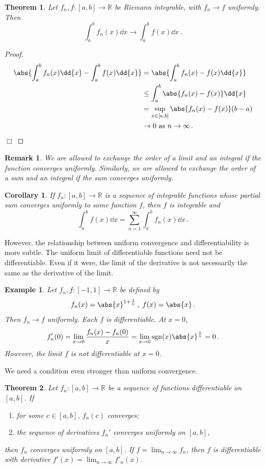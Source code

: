 \documentclass{article}
\theoremstyle{plain}\theoremheaderfont{\normalfont\itshape}\theorembodyfont{\rmfamily}\theoremseparator{.}\newtheorem*{rem}{Remark}\newtheorem*{ex}{Example}\newtheorem*{proof}{Proof}\newtheorem*{altp}{Alternative proof}
\theoremstyle{plain}\theoremheaderfont{\normalfont\bfseries}\theorembodyfont{\rmfamily}\theoremseparator{.}\newtheorem{thm}{Theorem}[section]\newtheorem{lem}[thm]{Lemma}\newtheorem{prop}[thm]{Proposition}\newtheorem*{cor}{Corollary}\newtheorem{defn}[thm]{Definition}\newtheorem{clm}[thm]{Claim}\newtheorem{clminproof}{Claim}
\theoremstyle{break}\theoremheaderfont{\normalfont\itshape}\theorembodyfont{\rmfamily}\theoremseparator{.\medskip}\newtheorem*{proofskip}{Proof}\newtheorem*{exs}{Examples}\newtheorem*{rems}{Remarks}
\theoremstyle{break}\theoremheaderfont{\normalfont\bfseries}\theorembodyfont{\rmfamily}\theoremseparator{.\medskip}\newtheorem{lemskip}[thm]{Lemma}\newtheorem{defnskip}[thm]{Definition}\newtheorem{propskip}[thm]{Proposition}\newtheorem{thmskip}[thm]{Theorem}
\numberwithin{equation}{section}
\newcommand{\qed}{\hfill\ensuremath{\Box}}
\begin{document}
	\begin{thm}
		Let \(f_n,f:[a,b]\to\mathbb{R}\) be Riemann integrable, with \(f_n\to f\) uniformly. Then
		\[\int_{a}^{b}f_n(x)\dd{x}\to\int_{a}^{b}f(x)\dd{x}\,.\]
	\end{thm}
	\begin{proof}
		\begin{align*}
			\abs{\int_{a}^{b}f_n(x)\dd{x}-\int_{a}^{b}f(x)\dd{x}}&=\abs{\int_{a}^{b}f_n(x)-f(x)\dd{x}}\\
			&\le\int_{a}^{b}\abs{f_n(x)-f(x)}\dd{x}\\
			&=\sup_{x\in[a,b]}\abs{f_n(x)-f(x)}(b-a)\\
			&\to 0 \text{ as }n\to\infty\,.
		\end{align*}\qed
	\end{proof}
	\begin{rem}
		We are allowed to exchange the order of a limit and an integral if the function converges uniformly. Similarly, we are allowed to exchange the order of a sum and an integral if the sum converges uniformly.
	\end{rem}
	\begin{cor}
		If \(f_n:[a,b]\to\mathbb{R}\) is a sequence of integrable functions whose partial sum converges uniformly to some function \(f\), then \(f\) is integrable and
		\[\int_{a}^{b}f(x)\dd{x}=\sum_{n=1}^{\infty}\int_{a}^{b}f_n(x)\dd{x}\,.\]
	\end{cor}

	However, the relationship between uniform convergence and differentiability is more subtle. The uniform limit of differentiable functions need not be differentiable. Even if it were, the limit of the derivative is not necessarily the same as the derivative of the limit.
	\begin{ex}
		Let \(f_n,f:[-1,1]\to\mathbb{R}\) be defined by
		\[f_n(x)=\abs{x}^{1+\frac{1}{n}}\,,\; f(x)=\abs{x}\,.\]
		Then \(f_n\to f\) uniformly. Each \(f\) is differentiable. At \(x=0\),
		\[f_n'(0)=\lim_{x\to 0}\frac{f_n(x)-f_n(0)}{x}=\lim_{x\to 0}\mathrm{sgn}(x)\abs{x}^{\frac{1}{n}}=0\,.\]
		However, the limit \(f\) is not differentiable at \(x=0\).
	\end{ex}
	We need a condition even stronger than uniform convergence.
	\begin{thm}
		Let \(f_n:[a,b]\to\mathbb{R}\) be a sequence of functions differentiable on \([a,b]\). If
		\begin{enumerate}[topsep=0pt]
			\item[(i)] for some \(c\in[a,b]\), \(f_n(c)\) converges;
			\item[(ii)] the sequence of derivatives \(f_n'\) converges uniformly on \([a,b]\),
		\end{enumerate}
		then \(f_n\) converges uniformly on \([a,b]\). If \(f=\lim_{n\to\infty}f_n\), then \(f\) is differentiable with derivative \(f'(x)=\lim_{n\to\infty}f'_n(x)\).
	\end{thm}
\end{document}
